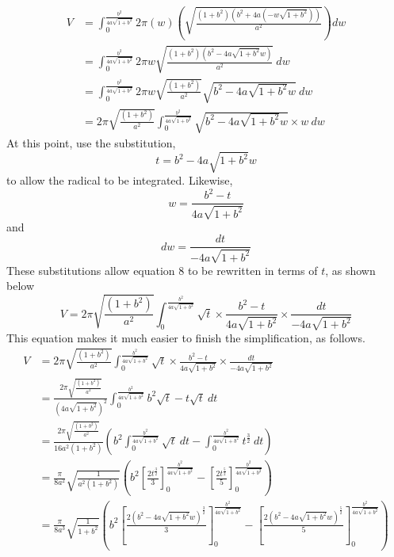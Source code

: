 \documentclass{article}
\begin{document}
\begin{align*}
V &= \int_0^{\frac{b^2}{4a\sqrt{1+b^2}}}2\pi\left(w\right)\left(\sqrt{\frac{\left(1+b^2\right)\left(b^2+4a\left(-w\sqrt{1+b^2}\right)\right)}{a^2}}\right)dw\\
   &= \int_0^{\frac{b^2}{4a\sqrt{1+b^2}}}2\pi w\sqrt{\frac{\left(1+b^2\right)\left(b^2-4a\sqrt{1+b^2}w\right)}{a^2}}\ dw\\
   &= \int_0^{\frac{b^2}{4a\sqrt{1+b^2}}}2\pi w\sqrt{\frac{\left(1+b^2\right)}{a^2}}\sqrt{b^2-4a\sqrt{1+b^2}w}\ dw\\
   &= 2\pi\sqrt{\frac{\left(1+b^2\right)}{a^2}}\int_0^{\frac{b^2}{4a\sqrt{1+b^2}}}\sqrt{b^2-4a\sqrt{1+b^2}w}\times w\ dw\tag{8}
\end{align*}
At this point, use the substitution,$$t=b^2-4a\sqrt{1+b^2}w$$to allow the radical to be integrated. Likewise,$$w=\frac{b^2-t}{4a\sqrt{1+b^2}}$$and$$dw=\frac{dt}{-4a\sqrt{1+b^2}}$$These substitutions allow equation 8 to be rewritten in terms of $t$, as shown below$$V=2\pi\sqrt{\frac{\left(1+b^2\right)}{a^2}}\int_0^{\frac{b^2}{4a\sqrt{1+b^2}}}\sqrt{t}\times\frac{b^2-t}{4a\sqrt{1+b^2}}\times\frac{dt}{-4a\sqrt{1+b^2}}$$This equation makes it much easier to finish the simplification, as follows.
\begin{align*}
V &= 2\pi\sqrt{\frac{\left(1+b^2\right)}{a^2}}\int_0^{\frac{b^2}{4a\sqrt{1+b^2}}}\sqrt{t}\times\frac{b^2-t}{4a\sqrt{1+b^2}}\times\frac{dt}{-4a\sqrt{1+b^2}}\\
   &= \frac{2\pi\sqrt{\frac{\left(1+b^2\right)}{a^2}}}{\left(4a\sqrt{1+b^2}\right)^2}\int_0^{\frac{b^2}{4a\sqrt{1+b^2}}}b^2\sqrt{t}-t\sqrt{t}\ dt\\
   &= \frac{2\pi\sqrt{\frac{\left(1+b^2\right)}{a^2}}}{16a^2\left(1+b^2\right)}\left(b^2\int_0^{\frac{b^2}{4a\sqrt{1+b^2}}}\sqrt{t}\ dt-\int_0^{\frac{b^2}{4a\sqrt{1+b^2}}}t^{\frac{3}{2}}\ dt\right)\\
   &= \frac{\pi}{8a^2}\sqrt{\frac{1}{a^2\left(1+b^2\right)}}\left(b^2\left[\frac{2t^{\frac{3}{2}}}{3}\right]_0^{\frac{b^2}{4a\sqrt{1+b^2}}}-\left[\frac{2t^{\frac{5}{2}}}{5}\right]_0^{\frac{b^2}{4a\sqrt{1+b^2}}}\right)\\
   &= \frac{\pi}{8a^3}\sqrt{\frac{1}{1+b^2}}\left(b^2\left[\frac{2\left(b^2-4a\sqrt{1+b^2}w\right)^{\frac{3}{2}}}{3}\right]_0^{\frac{b^2}{4a\sqrt{1+b^2}}}-\left[\frac{2\left(b^2-4a\sqrt{1+b^2}w\right)^{\frac{5}{2}}}{5}\right]_0^{\frac{b^2}{4a\sqrt{1+b^2}}}\right)
\end{align*}
\end{document}
